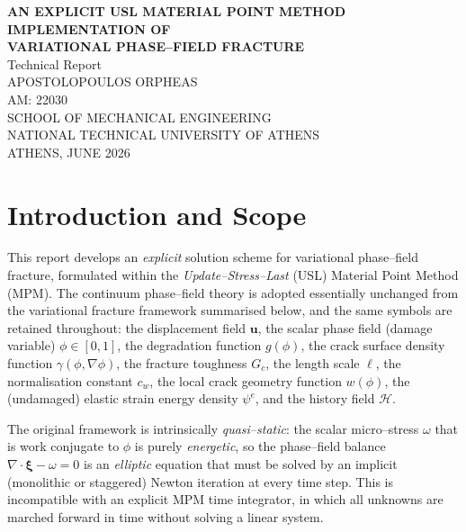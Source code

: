 \documentclass[12pt,a4paper]{article}
\newcommand{\eng}[1]{#1}
\newcommand{\bxi}{\boldsymbol{\xi}}
\newcommand{\bu}{\mathbf{u}}
\begin{document}
	\setlength{\parindent}{0pt}

	\begin{titlepage}
		\centering
		{\LARGE\bfseries AN EXPLICIT USL MATERIAL POINT METHOD \\[.3cm]
		IMPLEMENTATION OF \\[.5cm] VARIATIONAL PHASE--FIELD FRACTURE}\\[3cm]

		{\large Technical Report}\\[1cm]

		{\large APOSTOLOPOULOS ORPHEAS}\\[0.5cm]
		{\large AM: 22030}\\[3cm]

		{\large SCHOOL OF MECHANICAL ENGINEERING}\\
		{\large NATIONAL TECHNICAL UNIVERSITY OF ATHENS}\\[5cm]

		{\large ATHENS, JUNE 2026}
	\end{titlepage}

	\tableofcontents
	\newpage

	\section{Introduction and Scope}

	This report develops an \emph{explicit} solution scheme for variational
	phase--field fracture, formulated within the \emph{Update--Stress--Last}
	(\eng{USL}) Material Point Method (\eng{MPM}). The continuum phase--field
	theory is adopted essentially unchanged from the variational fracture
	framework summarised below, and the same symbols are retained throughout:
	the displacement field $\bu$, the scalar phase field (damage variable)
	$\phi\in[0,1]$, the degradation function $g(\phi)$, the crack surface density
	function $\gamma(\phi,\nabla\phi)$, the fracture toughness $G_c$, the length
	scale $\ell$, the normalisation constant $c_w$, the local crack geometry
	function $w(\phi)$, the (undamaged) elastic strain energy density $\psi^e$, and
	the history field $\mathcal{H}$.

	The original framework is intrinsically \emph{quasi--static}: the scalar
	micro--stress $\omega$ that is work conjugate to $\phi$ is purely
	\emph{energetic}, so the phase--field balance~$\nabla\cdot\bxi-\omega=0$ is an
	\emph{elliptic} equation that must be solved by an implicit (monolithic or
	staggered) Newton iteration at every time step. This is incompatible with an
	explicit MPM time integrator, in which all unknowns are marched forward in
	time without solving a linear system.
\end{document}
